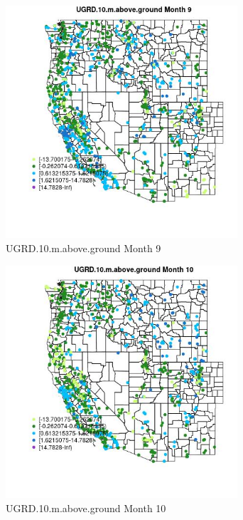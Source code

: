 \begin{figure} 
\centering  
\includegraphics[width=0.77\textwidth]{Code_Outputs/Report_ML_input_PM25_Step4_part_f_de_duplicated_aveswNAs_MapObsMo9UGRD10maboveground.jpg} 
\caption{\label{fig:Report_ML_input_PM25_Step4_part_f_de_duplicated_aveswNAsMapObsMo9UGRD10maboveground}UGRD.10.m.above.ground Month 9} 
\end{figure} 
 

\begin{figure} 
\centering  
\includegraphics[width=0.77\textwidth]{Code_Outputs/Report_ML_input_PM25_Step4_part_f_de_duplicated_aveswNAs_MapObsMo10UGRD10maboveground.jpg} 
\caption{\label{fig:Report_ML_input_PM25_Step4_part_f_de_duplicated_aveswNAsMapObsMo10UGRD10maboveground}UGRD.10.m.above.ground Month 10} 
\end{figure} 
 


